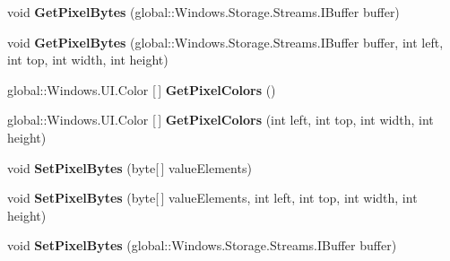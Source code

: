 \begin{DoxyCompactItemize}
void {\bfseries Get\+Pixel\+Bytes} (global\+::\+Windows.\+Storage.\+Streams.\+I\+Buffer buffer)
\item 
\mbox{\label{interface_microsoft_1_1_graphics_1_1_canvas_1_1_i_canvas_bitmap_a6854e3ad20296f41992100acc94e6bdb}} 
void {\bfseries Get\+Pixel\+Bytes} (global\+::\+Windows.\+Storage.\+Streams.\+I\+Buffer buffer, int left, int top, int width, int height)
\item 
\mbox{\label{interface_microsoft_1_1_graphics_1_1_canvas_1_1_i_canvas_bitmap_ad6aeb3bf7ad3092e46d6a3133472b1d1}} 
global\+::\+Windows.\+U\+I.\+Color \mbox{[}$\,$\mbox{]} {\bfseries Get\+Pixel\+Colors} ()
\item 
\mbox{\label{interface_microsoft_1_1_graphics_1_1_canvas_1_1_i_canvas_bitmap_ac162dc28f7d3a5de4034936d417c24e5}} 
global\+::\+Windows.\+U\+I.\+Color \mbox{[}$\,$\mbox{]} {\bfseries Get\+Pixel\+Colors} (int left, int top, int width, int height)
\item 
\mbox{\label{interface_microsoft_1_1_graphics_1_1_canvas_1_1_i_canvas_bitmap_a811bec820a040dca5292270d03b6431f}} 
void {\bfseries Set\+Pixel\+Bytes} (byte\mbox{[}$\,$\mbox{]} value\+Elements)
\item 
\mbox{\label{interface_microsoft_1_1_graphics_1_1_canvas_1_1_i_canvas_bitmap_af373b13151ccbea6a489af0b71c86b6d}} 
void {\bfseries Set\+Pixel\+Bytes} (byte\mbox{[}$\,$\mbox{]} value\+Elements, int left, int top, int width, int height)
\item 
\mbox{\label{interface_microsoft_1_1_graphics_1_1_canvas_1_1_i_canvas_bitmap_a21c32cb7fb31c8fd6a1decdcb79876d2}} 
void {\bfseries Set\+Pixel\+Bytes} (global\+::\+Windows.\+Storage.\+Streams.\+I\+Buffer buffer)
\item 
\mbox{\label{interface_microsoft_1_1_graphics_1_1_canvas_1_1_i_canvas_bitmap_a593c5894545aa39d6cf008b46bef4972}} 

\end{DoxyCompactItemize}
